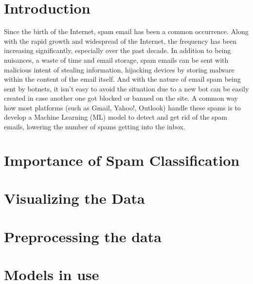 \documentclass[conference]{IEEEtran}
\begin{document}
    \section{Introduction}
    \label{sec:introduction}
    Since the birth of the Internet, spam email has been a common occurrence.
    Along with the rapid growth and widespread of the Internet, the frequency has been increasing significantly, especially over the past decade.
    In addition to being nuisances, a waste of time and email storage, spam emails can be sent with malicious intent of stealing information, hijacking devices by storing malware within the content of the email itself.
    And with the nature of email spam being sent by botnets, it isn't easy to avoid the situation due to a new bot can be easily created in case another one got blocked or banned on the site.
    A common way how most platforms (such as Gmail, Yahoo!, Outlook) handle these spams is to develop a Machine Learning (ML) model to detect and get rid of the spam emails, lowering the number of spams getting into the inbox.

    \section{Importance of Spam Classification}
    \label{sec:importance-of-spam-classification}
    

    \section{Visualizing the Data}
    \label{sec:visualizing-the-data}
    

    \section{Preprocessing the data}
    \label{sec:preprocessing-the-data}
    

    \section{Models in use}
    \label{sec:models-in-use}
    
\end{document}
